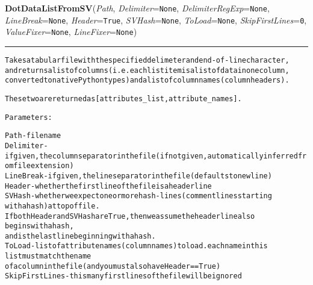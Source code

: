 \hspace{.8\funcindent}\begin{boxedminipage}{\funcwidth}

    \raggedright \textbf{DotDataListFromSV}(\textit{Path}, \textit{Delimiter}={\tt None}, \textit{DelimiterRegExp}={\tt None}, \textit{LineBreak}={\tt None}, \textit{Header}={\tt True}, \textit{SVHash}={\tt None}, \textit{ToLoad}={\tt None}, \textit{SkipFirstLines}={\tt 0}, \textit{ValueFixer}={\tt None}, \textit{LineFixer}={\tt None})

    \vspace{-1.5ex}

    \rule{\textwidth}{0.5\fboxrule}
\setlength{\parskip}{2ex}
\begin{alltt}
Takes a tabular file with the specified delimeter and end-of-line character,
and returns a list of columns (i.e. each list item is a list of data in one column, 
converted to native Python types) and a list of column names (column headers).

These two are returned as [attributes\_list, attribute\_names].

Parameters:

    Path - filename
    Delimiter - if given, the column separator in the file (if not given, automatically inferred from file extension)
    LineBreak - if given, the line separator in the file (defaults to newline)
    Header - whether the first line of the file is a header line
    SVHash - whether we expect one or more hash-lines (comment lines starting
    with a hash) at top of file.
       If both Header and SVHash are True, then we assume the header line also 
       begins with a hash,
       and is the last line beginning with a hash.
    ToLoad - list of attribute names (column names) to load.   each name in this 
    list must match the name
       of a column in the file (and you must also have Header == True )
    SkipFirstLines - this many first lines of the file will be ignored   
\end{alltt}

\setlength{\parskip}{1ex}
    \end{boxedminipage}

